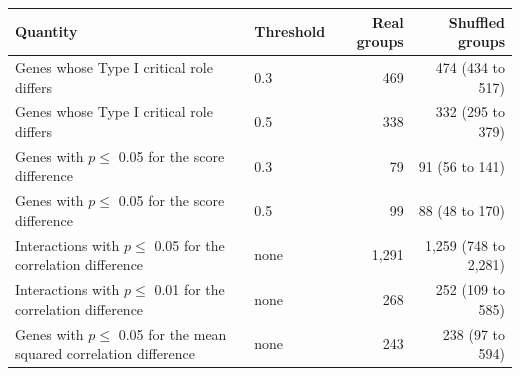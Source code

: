 \begin{tabular}{p{7.2cm}lrr}
\toprule
Quantity & Threshold & Real groups & Shuffled groups \\
\midrule
Genes whose Type I critical role differs & 0.3 & 469 & 474 (434 to 517) \\
Genes whose Type I critical role differs & 0.5 & 338 & 332 (295 to 379) \\
Genes with $p \leq$ 0.05 for the score difference & 0.3 & 79 & 91 (56 to 141) \\
Genes with $p \leq$ 0.05 for the score difference & 0.5 & 99 & 88 (48 to 170) \\
Interactions with $p \leq$ 0.05 for the correlation difference & none & 1,291 & 1,259 (748 to 2,281) \\
Interactions with $p \leq$ 0.01 for the correlation difference & none & 268 & 252 (109 to 585) \\
Genes with $p \leq$ 0.05 for the mean squared correlation difference & none & 243 & 238 (97 to 594) \\
\bottomrule
\end{tabular}
